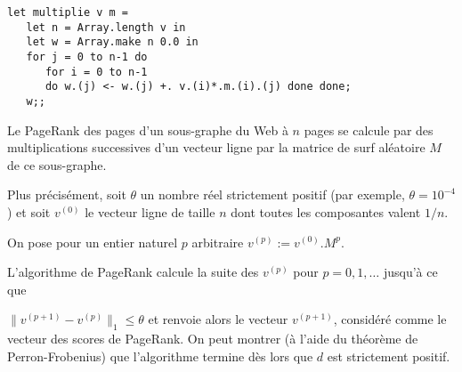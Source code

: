 \begin{Answer}
\begin{lstlisting}
let multiplie v m =
   let n = Array.length v in
   let w = Array.make n 0.0 in
   for j = 0 to n-1 do
      for i = 0 to n-1 
      do w.(j) <- w.(j) +. v.(i)*.m.(i).(j) done done;
   w;;
\end{lstlisting}
\end{Answer}
Le PageRank des pages d'un sous-graphe du Web à $n$ pages se calcule par des multiplications successives d'un vecteur ligne par la matrice de surf aléatoire $M$ de ce sous-graphe. 

Plus précisément, soit $\theta$ un nombre réel strictement positif (par exemple, $\theta = 10^{-4}$) et soit $v^{(0)}$ le vecteur ligne de taille $n$ dont toutes les composantes valent $1/n$. 

On pose pour un entier naturel $p$ arbitraire $v^{(p)} := v^{(0)}.M^p$. 

L'algorithme de PageRank calcule la suite des $v^{(p)}$ pour $p=0,1,\dots$ jusqu'à ce que

$\|v^{(p+1)}-v^{(p)}\|_1\le  \theta$ et renvoie alors le vecteur $v^{(p+1)}$, considéré comme le vecteur des scores de PageRank. 
On peut montrer (à l'aide du théorème de Perron-Frobenius) que l'algorithme termine dès lors que $d$ est strictement positif.

\medskip

